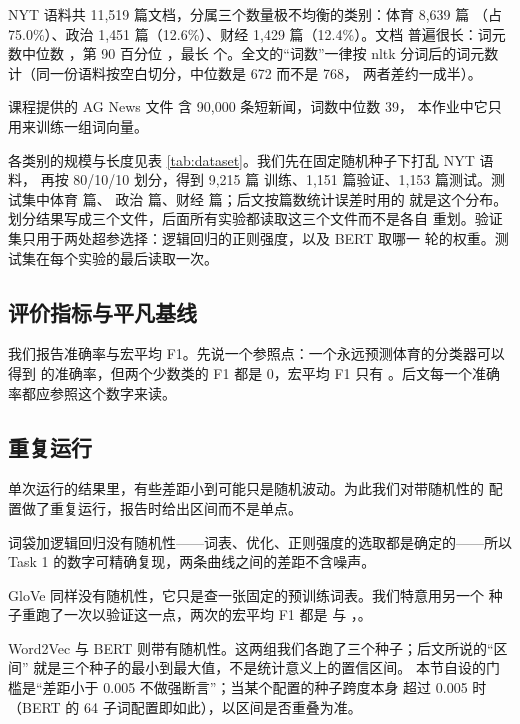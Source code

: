 \documentclass[11pt]{article}
\begin{document}
NYT 语料共 11{,}519 篇文档，分属三个数量极不均衡的类别：体育 8{,}639 篇
（占 75.0\%）、政治 1{,}451 篇（12.6\%）、财经 1{,}429 篇（12.4\%）。文档
普遍很长：词元数中位数 \resultMedianTokens{}，第 90 百分位
\resultPercentileTokens{}，最长 \resultMaxTokens{} 个。全文的``词数''一律按
nltk 分词后的词元数计（同一份语料按空白切分，中位数是 672 而不是 768，
两者差约一成半）。

课程提供的 AG News 文件\citep{zhang2015character} 含 90{,}000 条短新闻，词数中位数 39，
本作业中它只用来训练一组词向量。



各类别的规模与长度见表 \ref{tab:dataset}。我们先在固定随机种子下打乱 NYT 语料，
再按 80/10/10 划分，得到 9{,}215 篇
训练、1{,}151 篇验证、1{,}153 篇测试。测试集中体育 \resultTestSpo{} 篇、
政治 \resultTestPol{} 篇、财经 \resultTestBiz{} 篇；后文按篇数统计误差时用的
就是这个分布。划分结果写成三个文件，后面所有实验都读取这三个文件而不是各自
重划。验证集只用于两处超参选择：逻辑回归的正则强度，以及 BERT 取哪一
轮的权重。测试集在每个实验的最后读取一次。

\subsection{评价指标与平凡基线}

我们报告准确率与宏平均 F1。先说一个参照点：一个永远预测体育的分类器可以
得到 \resultMajorityAcc{} 的准确率，但两个少数类的 F1 都是 0，宏平均 F1 只有
\resultMajorityFOne{}。后文每一个准确率都应参照这个数字来读。

\subsection{重复运行}

单次运行的结果里，有些差距小到可能只是随机波动。为此我们对带随机性的
配置做了重复运行，报告时给出区间而不是单点。

词袋加逻辑回归没有随机性——词表、优化、正则强度的选取都是确定的——所以
Task 1 的数字可精确复现，两条曲线之间的差距不含噪声。

GloVe 同样没有随机性，它只是查一张固定的预训练词表。我们特意用另一个
种子重跑了一次以验证这一点，两次的宏平均 F1 都是 \resultGloveRunA{} 与
\resultGloveRunB{}，\resultGloveDeterministic{}。

Word2Vec 与 BERT 则带有随机性。这两组我们各跑了三个种子；后文所说的``区间''
就是三个种子的最小到最大值，不是统计意义上的置信区间。
本节自设的门槛是``差距小于 0.005 不做强断言''；当某个配置的种子跨度本身
超过 0.005 时（BERT 的 64 子词配置即如此），以区间是否重叠为准。
\end{document}
